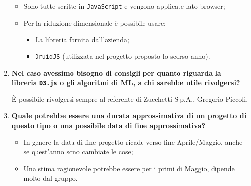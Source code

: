 \documentclass[11pt]{article}
\begin{document}
\begin{enumerate}
			\begin{itemize}
				\item Sono tutte scritte in \texttt{JavaScript} e vengono applicate lato browser;
				\item Per la riduzione dimensionale è possibile usare:
				\begin{itemize}
					\item La libreria fornita dall'azienda;
					\item \texttt{DruidJS} (utilizzata nel progetto proposto lo scorso anno).
				\end{itemize}
			\end{itemize}
			
			\bigskip
			
			\item \textbf{Nel caso avessimo bisogno di consigli per quanto riguarda la libreria \texttt{D3.js} o gli
			algoritmi di ML, a chi sarebbe utile rivolgersi?}
			
			\medskip
			
			È possibile rivolgersi sempre al referente di Zucchetti S.p.A., Gregorio Piccoli.
			
			\bigskip
			
			\item \textbf{Quale potrebbe essere una durata approssimativa di un progetto di questo tipo o una possibile data di
			fine approssimativa? }
			
			\medskip
			
			\begin{itemize}
				\item In genere la data di fine progetto ricade verso fine Aprile/Maggio, anche se quest'anno sono cambiate le cose;
				\item Una stima ragionevole potrebbe essere per i primi di Maggio, dipende molto dal gruppo.
			\end{itemize}

		\end{enumerate}
		
\end{document}
